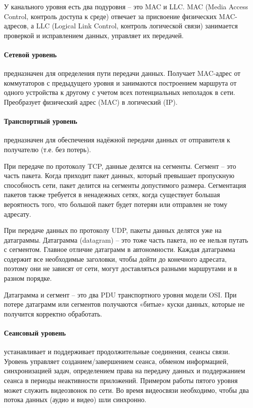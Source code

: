 У канального уровня есть два подуровня -- это MAC и LLC. MAC (Media Access Control, контроль доступа к среде) отвечает за присвоение физических MAC-адресов, а LLC (Logical Link Control, контроль логической связи) занимается проверкой и исправлением данных, управляет их передачей.

\paragraph*{Сетевой уровень}\label{b17:osi:lev3} предназначен для определения пути передачи данных. Получает MAC-адрес от коммутаторов с предыдущего уровня и занимаются построением маршрута от одного устройства к другому с учетом всех потенциальных неполадок в сети. Преобразует физический адрес (MAC) в логический (IP).

\paragraph*{Транспортный уровень}\label{b17:osi:lev4} предназначен для обеспечения надёжной передачи данных от отправителя к получателю (т.е. без потерь).

При передаче по протоколу TCP, данные делятся на сегменты. Сегмент -- это часть пакета. Когда приходит пакет данных, который превышает пропускную способность сети, пакет делится на сегменты допустимого размера. Сегментация пакетов также требуется в ненадежных сетях, когда существует большая вероятность того, что большой пакет будет потерян или отправлен не тому адресату.

При передаче данных по протоколу UDP, пакеты данных делятся уже на датаграммы. Датаграмма (datagram) -- это тоже часть пакета, но ее нельзя путать с сегментом. Главное отличие датаграмм в автономности. Каждая датаграмма содержит все необходимые заголовки, чтобы дойти до конечного адресата, поэтому они не зависят от сети, могут доставляться разными маршрутами и в разном порядке.

Датаграмма и сегмент -- это два PDU транспортного уровня модели OSI. При потере датаграмм или сегментов получаются «битые» куски данных, которые не получится корректно обработать.

\paragraph*{Сеансовый уровень}\label{b17:osi:lev5} устанавливает и поддерживает продолжительные соединения, сеансы связи.
Уровень управляет созданием/завершением сеанса, обменом информацией, синхронизацией задач, определением права на передачу данных и поддержанием сеанса в периоды неактивности приложений.
Примером работы пятого уровня может служить видеозвонок по сети. Во время видеосвязи необходимо, чтобы два потока данных (аудио и видео) шли синхронно.

